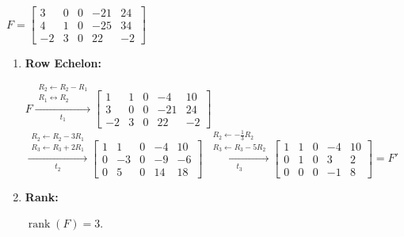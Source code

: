 $F=
\begin{bmatrix}
    3 & 0 & 0 & -21 & 24 \\
    4 & 1 & 0 & -25 & 34 \\
   -2 & 3 & 0 & 22 & -2
\end{bmatrix}
$ \\[1.0em]

\begin{enumerate}
    \item
    \textbf{Row Echelon:} \\[1.0em]
    \begin{answer}
        $F \xrightarrow[t_1]{
            \substack{
                R_2 \leftarrow R_2-R_1 \\
                R_1 \leftrightarrow R_2
            }
        }
        \begin{bmatrix}
            1 & 1 & 0 & -4 & 10 \\
            3 & 0 & 0 & -21 & 24 \\
           -2 & 3 & 0 & 22 & -2
        \end{bmatrix}
        $ \\[1.0em]

        $\xrightarrow[t_2]{
            \substack{
                R_2 \leftarrow R_2-3R_1 \\
                R_3 \leftarrow R_3+2R_1
            }
        }
        \begin{bmatrix}
            1 & 1 & 0 & -4 & 10 \\
            0 & -3 & 0 & -9 & -6 \\
            0 & 5 & 0 & 14 & 18
        \end{bmatrix}
        $
        $\xrightarrow[t_3]{
            \substack{
                R_2 \leftarrow -\frac{1}{3}R_2 \\
                R_3 \leftarrow R_3-5R_2
            }
        }
        \begin{bmatrix}
            1 & 1 & 0 & -4 & 10 \\
            0 & 1 & 0 & 3 & 2 \\
            0 & 0 & 0 & -1 & 8
        \end{bmatrix}
        = F'$
    \end{answer}

    \item
    \textbf{Rank:}
    \begin{answer}
        $\operatorname{rank}(F)=3.$
    \end{answer} \\


\end{enumerate}
